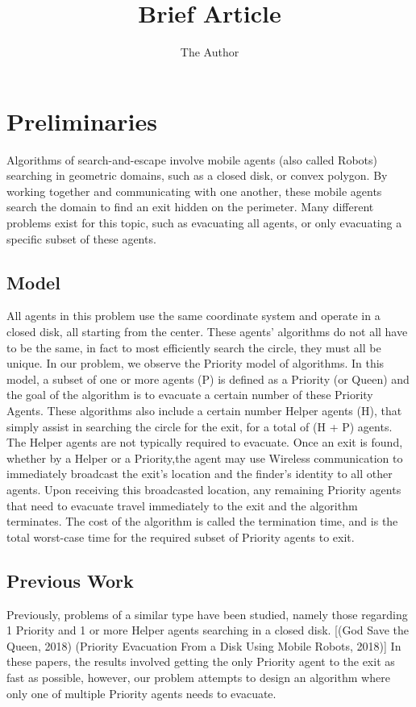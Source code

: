 \documentclass[11pt]{amsart}
\title{Brief Article}
\author{The Author}
\begin{document}
\maketitle
\section{Preliminaries}

Algorithms of search-and-escape involve mobile agents (also called Robots)
searching in geometric domains, such as a closed disk, or convex polygon. By
working together and communicating with one another, these mobile agents search
the domain to find an exit hidden on the perimeter. Many different problems exist for
this topic, such as evacuating all agents, or only evacuating a specific subset of these
agents.

\subsection{Model}

All agents in this problem use the same coordinate system and operate in a closed
disk, all starting from the center. These agents' algorithms do not all have to be the same,
in fact to most efficiently search the circle, they must all be unique.
In our problem, we observe the Priority model of algorithms. In this model, a
subset of one or more agents (P) is defined as a Priority (or Queen) and the goal
of the algorithm is to evacuate a certain number of these Priority Agents. These
algorithms also include a certain number Helper agents (H), that simply assist in searching the circle
for the exit, for a total of (H + P) agents. The Helper agents are not typically required to evacuate.
Once an exit is found, whether by a Helper or a Priority,the agent may use
Wireless communication to immediately broadcast the exit's location and the finder's identity to all other agents.
Upon receiving this broadcasted location, any remaining Priority agents that
need to evacuate travel immediately to the exit and the algorithm terminates.
The cost of the algorithm is called the termination time, and is the total worst-case
time for the required subset of Priority agents to exit.

\subsection{Previous Work}

Previously, problems of a similar type have been studied, namely those regarding 1 Priority and 1
or more Helper agents searching in a closed disk. [(God Save the Queen, 2018)
(Priority Evacuation From a Disk Using Mobile Robots, 2018)]
In these papers, the results involved getting the only Priority agent to the exit
as fast as possible, however, our problem attempts to design an algorithm where
only one of multiple Priority agents needs to evacuate.
\end{document}
